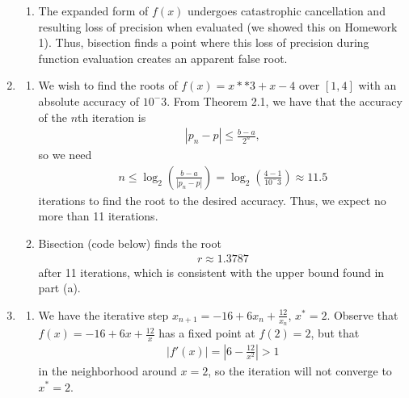 \documentclass[10pt]{article}
\begin{document}
\begin{enumerate}
\begin{enumerate}
      \item The expanded form of \(f(x)\) undergoes catastrophic cancellation and resulting loss of precision when evaluated (we showed this on Homework 1). Thus, bisection finds a point where this loss of precision during function evaluation creates an apparent false root.
    \end{enumerate}

    {\small }

    \newpage

    \item \begin{enumerate}
      \item We wish to find the roots of \(f(x) = x**3 + x - 4\) over \([1,4]\) with an absolute accuracy of \(10^-3\). From Theorem 2.1, we have that the accuracy of the \(n\)th iteration is \begin{align*}
          |p_n-p| \leq \frac{b-a}{2^n}, 
      \end{align*} so we need \begin{align*}
          n \leq \log_2 \left( \frac{b-a}{|p_n-p|} \right) = \log _2 \left( \frac{4-1}{10^-3} \right) \approx 11.5
      \end{align*} iterations to find the root to the desired accuracy. Thus, we expect no more than 11 iterations.

      \item Bisection (code below) finds the root \begin{align*}
          r \approx 1.3787
      \end{align*} after 11 iterations, which is consistent with the upper bound found in part (a).

      {\small }      
    \end{enumerate}

    \newpage

    \item \begin{enumerate}
      \item We have the iterative step \(x_{n+1} = -16 + 6x_n + \frac{12}{x_n}\), \(x^* = 2\). Observe that \(f(x) = -16 + 6x + \frac{12}{x}\) has a fixed point at \(f(2) = 2\), but that \begin{align*}
          |f'(x)| = \left|6-\frac{12}{x^2}\right| > 1
      \end{align*} in the neighborhood around \(x=2\), so the iteration will not converge to \(x^* = 2\).


\end{enumerate}
\end{enumerate}
\end{document}
